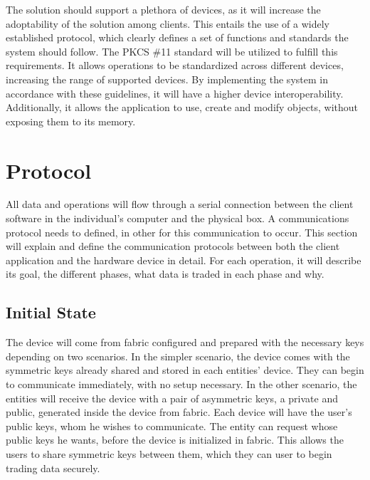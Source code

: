 The solution should support a plethora of devices, as it will increase the adoptability of the solution among clients. This entails the use of a widely established protocol, which clearly defines a set of functions and standards the system should follow.
The \ac{PKCS} \#11 standard will be utilized to fulfill this requirements. It allows operations to be standardized across different devices, increasing the range of supported devices. By implementing the system in accordance with these guidelines, it will have a higher device interoperability. Additionally, it allows the application to use, create and modify objects, without exposing them to its memory.

\section{Protocol}\label{chap:implementation:protocol}

All data and operations will flow through a serial connection between the client software in the individual's computer and the physical box. A communications protocol needs to defined, in other for this communication to occur.
This section will explain and define the communication protocols between both the client application and the hardware device in detail. For each operation, it will describe its goal, the different phases, what data is traded in each phase and why.

\subsection{Initial State}\label{chap:implementation:protocol:initial-state}

The device will come from fabric configured and prepared with the necessary keys depending on two scenarios. In the simpler scenario, the device comes with the symmetric keys already shared and stored in each entities' device. They can begin to communicate immediately, with no setup necessary.
In the other scenario, the entities will receive the device with a pair of asymmetric keys, a private and public, generated inside the device from fabric. Each device will have the user's public keys, whom he wishes to communicate. The entity can request whose public keys he wants, before the device is initialized in fabric. This allows the users to share symmetric keys between them, which they can user to begin trading data securely.

